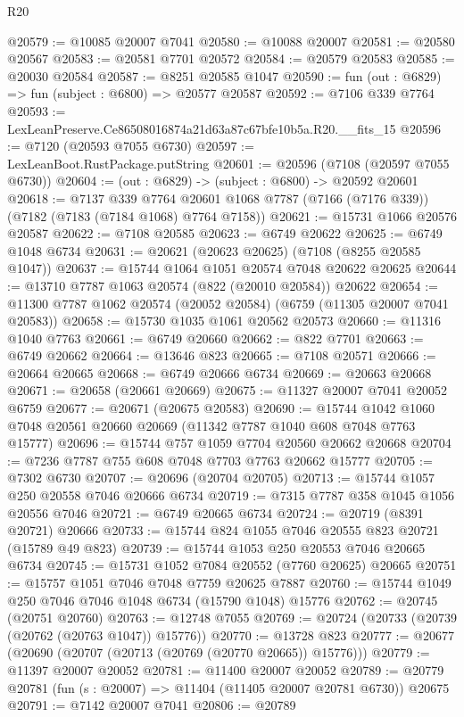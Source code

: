 \begin{lexlean}{R20}
\begin{coremodule}
{@20579 := @10085 @20007 @7041
@20580 := @10088 @20007
@20581 := @20580 @20567
@20583 := @20581 @7701 @20572
@20584 := @20579 @20583
@20585 := @20030 @20584
@20587 := @8251 @20585 @1047
@20590 := fun (out : @6829) => fun (subject : @6800) => @20577 @20587
@20592 := @7106 @339 @7764
@20593 := LexLeanPreserve.Ce86508016874a21d63a87c67bfe10b5a.R20.__fits_15
@20596 := @7120 (@20593 @7055 @6730)
@20597 := LexLeanBoot.RustPackage.putString
@20601 := @20596 (@7108 (@20597 @7055 @6730))
@20604 := (out : @6829) -> (subject : @6800) -> @20592 @20601
@20618 := @7137
    @339
    @7764
    @20601
    @1068
    @7787
    (@7166 (@7176 @339))
    (@7182 (@7183 (@7184 @1068) @7764 @7158))
@20621 := @15731 @1066 @20576 @20587
@20622 := @7108 @20585
@20623 := @6749 @20622
@20625 := @6749 @1048 @6734
@20631 := @20621 (@20623 @20625) (@7108 (@8255 @20585 @1047))
@20637 := @15744 @1064 @1051 @20574 @7048 @20622 @20625
@20644 := @13710 @7787 @1063 @20574 (@822 (@20010 @20584)) @20622
@20654 := @11300 @7787 @1062 @20574 (@20052 @20584) (@6759 (@11305 @20007 @7041 @20583))
@20658 := @15730 @1035 @1061 @20562 @20573
@20660 := @11316 @1040 @7763
@20661 := @6749 @20660
@20662 := @822 @7701
@20663 := @6749 @20662
@20664 := @13646 @823
@20665 := @7108 @20571
@20666 := @20664 @20665
@20668 := @6749 @20666 @6734
@20669 := @20663 @20668
@20671 := @20658 (@20661 @20669)
@20675 := @11327 @20007 @7041 @20052 @6759
@20677 := @20671 (@20675 @20583)
@20690 := @15744 @1042 @1060 @7048 @20561 @20660 @20669 (@11342 @7787 @1040 @608 @7048 @7763 @15777)
@20696 := @15744 @757 @1059 @7704 @20560 @20662 @20668
@20704 := @7236 @7787 @755 @608 @7048 @7703 @7763 @20662 @15777
@20705 := @7302 @6730
@20707 := @20696 (@20704 @20705)
@20713 := @15744 @1057 @250 @20558 @7046 @20666 @6734
@20719 := @7315 @7787 @358 @1045 @1056 @20556 @7046
@20721 := @6749 @20665 @6734
@20724 := @20719 (@8391 @20721) @20666
@20733 := @15744 @824 @1055 @7046 @20555 @823 @20721 (@15789 @49 @823)
@20739 := @15744 @1053 @250 @20553 @7046 @20665 @6734
@20745 := @15731 @1052 @7084 @20552 (@7760 @20625) @20665
@20751 := @15757 @1051 @7046 @7048 @7759 @20625 @7887
@20760 := @15744 @1049 @250 @7046 @7046 @1048 @6734 (@15790 @1048) @15776
@20762 := @20745 (@20751 @20760)
@20763 := @12748 @7055
@20769 := @20724 (@20733 (@20739 (@20762 (@20763 @1047)) @15776))
@20770 := @13728 @823
@20777 := @20677 (@20690 (@20707 (@20713 (@20769 (@20770 @20665)) @15776)))
@20779 := @11397 @20007 @20052
@20781 := @11400 @20007 @20052
@20789 := @20779 @20781 (fun (s : @20007) => @11404 (@11405 @20007 @20781 @6730)) @20675
@20791 := @7142 @20007 @7041
@20806 := @20789
}
\end{coremodule}
\end{lexlean}
